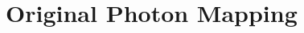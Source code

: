 \documentclass[main.tex]{subfiles}
\begin{document}
\section{Original Photon Mapping} \label{section:ppm_initial}
\end{document}
